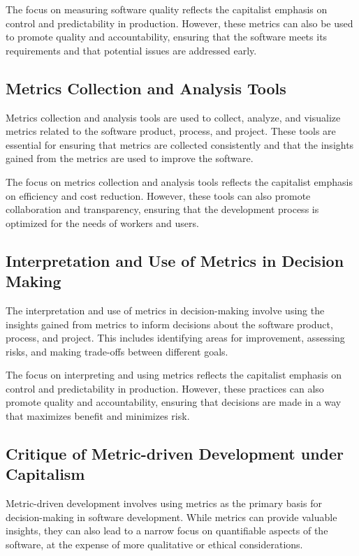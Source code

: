 \begin{refsection}
\begin{multicols}{2}
{The focus on measuring software quality reflects the capitalist emphasis on control and predictability in production. However, these metrics can also be used to promote quality and accountability, ensuring that the software meets its requirements and that potential issues are addressed early.

\subsection{Metrics Collection and Analysis Tools}

Metrics collection and analysis tools are used to collect, analyze, and visualize metrics related to the software product, process, and project. These tools are essential for ensuring that metrics are collected consistently and that the insights gained from the metrics are used to improve the software.

The focus on metrics collection and analysis tools reflects the capitalist emphasis on efficiency and cost reduction. However, these tools can also promote collaboration and transparency, ensuring that the development process is optimized for the needs of workers and users.

\subsection{Interpretation and Use of Metrics in Decision Making}

The interpretation and use of metrics in decision-making involve using the insights gained from metrics to inform decisions about the software product, process, and project. This includes identifying areas for improvement, assessing risks, and making trade-offs between different goals.

The focus on interpreting and using metrics reflects the capitalist emphasis on control and predictability in production. However, these practices can also promote quality and accountability, ensuring that decisions are made in a way that maximizes benefit and minimizes risk.

\subsection{Critique of Metric-driven Development under Capitalism}

Metric-driven development involves using metrics as the primary basis for decision-making in software development. While metrics can provide valuable insights, they can also lead to a narrow focus on quantifiable aspects of the software, at the expense of more qualitative or ethical considerations.

}
\end{multicols}
\end{refsection}
